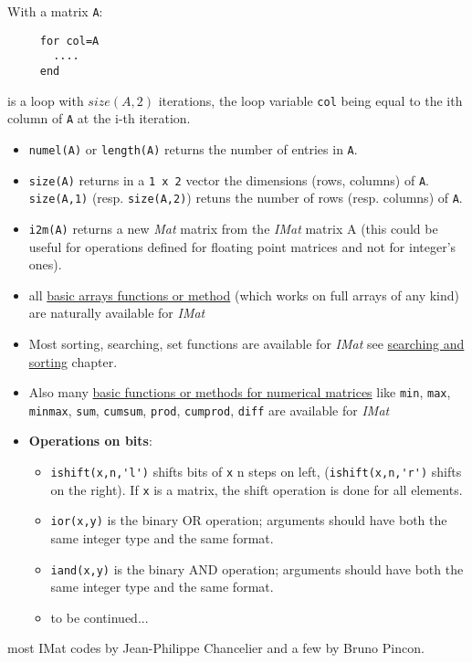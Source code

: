 
With a matrix \verb+A+:
\begin{verbatim}
     for col=A
       ....
     end
\end{verbatim} 
is a loop with $size(A,2)$ iterations, the loop 
variable  \verb+col+ being equal to the ith column of \verb+A+ at the i-th iteration.

\begin{itemize}
   \item \verb+numel(A)+ or \verb+length(A)+ returns the number of entries in \verb+A+.
   \item \verb+size(A)+ returns in a \verb+1 x 2+ vector the dimensions (rows, columns)
of \verb+A+. \verb+size(A,1)+ (resp. \verb+size(A,2)+) retuns the number of rows 
(resp. columns) of \verb+A+.
   \item \verb+i2m(A)+ returns a new \emph{Mat} matrix from the \emph{IMat} matrix A (this could be useful for
    operations defined for floating point matrices and not for integer's ones).  
   \item all \hyperlink{arrays}{basic arrays functions or method} (which works on full arrays of any kind) 
     are naturally available for \emph{IMat} 
    \item Most sorting, searching, set functions are available for \emph{IMat} see \hyperlink{searchandsort}{searching
      and sorting} chapter.
   \item Also many \hyperlink{basicnumarrays}{basic functions or methods for numerical matrices} like \verb+min+, 
      \verb+max+, \verb+minmax+, \verb+sum+, \verb+cumsum+, \verb+prod+,  \verb+cumprod+, \verb+diff+ are available
       for \emph{IMat}
   \item {\bf Operations on bits}: 
   \begin{itemize}
   \item \verb+ishift(x,n,'l')+ shifts bits of \verb+x+ n steps on left, (\verb+ishift(x,n,'r')+ shifts on the right).
          If \verb+x+ is a matrix, the shift operation is done for all elements.
   \item \verb+ior(x,y)+ is the binary OR operation; arguments should have both the same integer type
         and the same format.
   \item \verb+iand(x,y)+ is the binary AND operation; arguments should have both the same integer type
         and the same format. 
   \item to be continued...
   \end{itemize}
\end{itemize}


\begin{authors}
   most IMat codes by Jean-Philippe Chancelier and a few by Bruno Pincon.
\end{authors}
